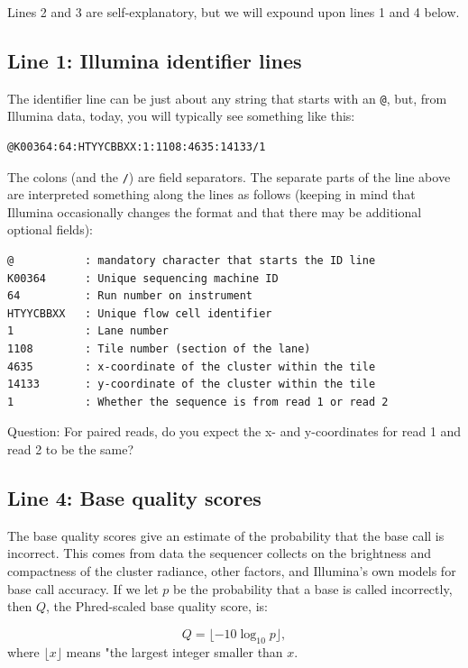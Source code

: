 \documentclass[]{krantz}
\begin{document}
Lines 2 and 3 are self-explanatory, but we will expound upon lines 1 and 4 below.

\hypertarget{illumina-ids}{%
\subsection{Line 1: Illumina identifier lines}\label{illumina-ids}}

The identifier line can be just about any string that starts with an \texttt{@}, but, from Illumina data, today,
you will typically see something like this:

\begin{verbatim}
@K00364:64:HTYYCBBXX:1:1108:4635:14133/1
\end{verbatim}

The colons (and the \texttt{/}) are field separators. The separate parts of the line
above are interpreted something along the lines as follows (keeping in mind that
Illumina occasionally changes the format and that there may be additional
optional fields):

\begin{verbatim}
@           : mandatory character that starts the ID line
K00364      : Unique sequencing machine ID 
64          : Run number on instrument
HTYYCBBXX   : Unique flow cell identifier
1           : Lane number
1108        : Tile number (section of the lane)
4635        : x-coordinate of the cluster within the tile
14133       : y-coordinate of the cluster within the tile
1           : Whether the sequence is from read 1 or read 2 
\end{verbatim}

Question: For paired reads, do you expect the x- and y-coordinates for read 1 and read 2 to
be the same?

\hypertarget{line-4-base-quality-scores}{%
\subsection{Line 4: Base quality scores}\label{line-4-base-quality-scores}}

The base quality scores give an estimate of the probability that the base call is incorrect.
This comes from data the sequencer collects on the brightness and compactness of the cluster
radiance, other factors, and Illumina's own models for base call accuracy. If we let \(p\)
be the probability that a base is called incorrectly, then \(Q\), the Phred-scaled base quality
score, is:

\[
Q = \lfloor-10\log_{10}p\rfloor,
\]
where \(\lfloor x \rfloor\) means "the largest integer smaller than \(x\).
\end{document}
